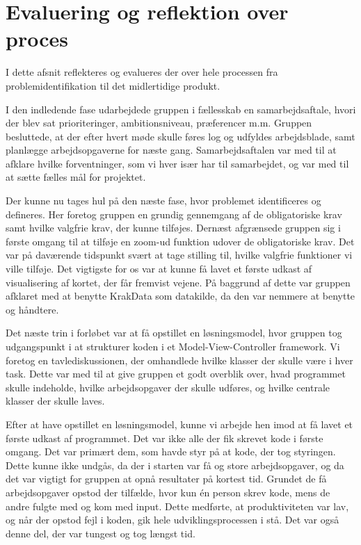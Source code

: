 \section{Evaluering og reflektion over proces}
\label{sec:evaluering_og_reflektion_over_proces}

I dette afsnit reflekteres og evalueres der over hele processen fra problemidentifikation til det midlertidige produkt. 

I den indledende fase udarbejdede gruppen i fællesskab en samarbejdsaftale, hvori der blev sat prioriteringer, ambitionsniveau, præferencer m.m. Gruppen besluttede, at der efter hvert møde skulle føres log og udfyldes arbejdsblade, samt planlægge arbejdsopgaverne for næste gang. Samarbejdsaftalen var med til at afklare hvilke forventninger, som vi hver især har til samarbejdet, og var med til at sætte fælles mål for projektet.

Der kunne nu tages hul på den næste fase, hvor problemet identificeres og defineres. Her foretog gruppen en grundig gennemgang af de obligatoriske krav samt hvilke valgfrie krav, der kunne tilføjes. Dernæst afgrænsede gruppen sig i første omgang til at tilføje en zoom-ud funktion udover de obligatoriske krav. Det var på daværende tidspunkt svært at tage stilling til, hvilke valgfrie funktioner vi ville tilføje. Det vigtigste for os var at kunne få lavet et første udkast af visualisering af kortet, der får fremvist vejene. På baggrund af dette var gruppen afklaret med at benytte KrakData som datakilde, da den var nemmere at benytte og håndtere.   

Det næste trin i forløbet var at få opstillet en løsningsmodel, hvor gruppen tog udgangspunkt i at strukturer koden i et Model-View-Controller framework. Vi foretog en tavlediskussionen, der omhandlede hvilke klasser der skulle være i hver task. Dette var med til at give gruppen et godt overblik over, hvad programmet skulle indeholde, hvilke arbejdsopgaver der skulle udføres, og hvilke centrale klasser der skulle laves. 

Efter at have opstillet en løsningsmodel, kunne vi arbejde hen imod at få lavet et første udkast af programmet. Det var ikke alle der fik skrevet kode i første omgang. Det var primært dem, som havde styr på at kode, der tog styringen. Dette kunne ikke undgås, da der i starten var få og store arbejdsopgaver, og da det var vigtigt for gruppen at opnå resultater på kortest tid. Grundet de få arbejdsopgaver opstod der tilfælde, hvor kun én person skrev kode, mens de andre fulgte med og kom med input. Dette medførte, at produktiviteten var lav, og når der opstod fejl i koden, gik hele udviklingsprocessen i stå. Det var også denne del, der var tungest og tog længst tid. 

